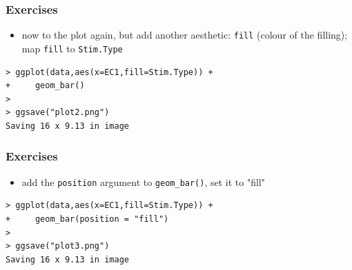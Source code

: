 \documentclass[xcolor={table},c]{beamer}
\begin{document}
\begin{frame}[fragile]\frametitle{Exercises}
  \begin{itemize}
  \item now to the plot again, but add another aesthetic: \texttt{fill} (colour of the filling); map \texttt{fill} to \texttt{Stim.Type}
  \end{itemize}
\begin{verbatim}
> ggplot(data,aes(x=EC1,fill=Stim.Type)) +
+     geom_bar()
> 
> ggsave("plot2.png")
Saving 16 x 9.13 in image
\end{verbatim}
\begin{center}
\end{center}
\end{frame}

\begin{frame}[fragile]\frametitle{Exercises}
  \begin{itemize}
  \item add the \texttt{position} argument to \texttt{geom\_bar()}, set it to "fill"
  \end{itemize}
\begin{verbatim}
> ggplot(data,aes(x=EC1,fill=Stim.Type)) +
+     geom_bar(position = "fill")
> 
> ggsave("plot3.png")
Saving 16 x 9.13 in image
\end{verbatim}
\begin{center}
\end{center}
\end{frame}
\end{document}
